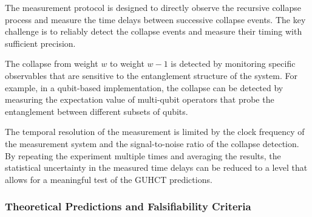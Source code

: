 \documentclass[11pt,a4paper]{article}
\makeatletter
\renewenvironment{proof}[1][\proofname]{\par
  \pushQED{\qed}%
  \normalfont \topsep6\p@\@plus6\p@\relax
  \trivlist
  \item[\hskip\labelsep
        \itshape
    #1\@addpunct{.}]\ignorespaces
}{%
  \popQED\endtrivlist\@endpefalse
}
\makeatother
\begin{document}
\begin{proof}
The measurement protocol is designed to directly observe the recursive collapse process and measure the time delays between successive collapse events. The key challenge is to reliably detect the collapse events and measure their timing with sufficient precision.

The collapse from weight $w$ to weight $w-1$ is detected by monitoring specific observables that are sensitive to the entanglement structure of the system. For example, in a qubit-based implementation, the collapse can be detected by measuring the expectation value of multi-qubit operators that probe the entanglement between different subsets of qubits.

The temporal resolution of the measurement is limited by the clock frequency of the measurement system and the signal-to-noise ratio of the collapse detection. By repeating the experiment multiple times and averaging the results, the statistical uncertainty in the measured time delays can be reduced to a level that allows for a meaningful test of the GUHCT predictions.
\end{proof}

\subsubsection{Theoretical Predictions and Falsifiability Criteria}
\label{ssubsec:delay_falsifiability}
\end{document}
